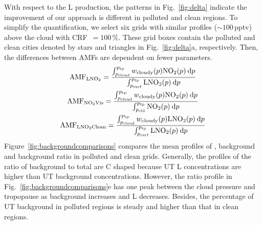 \documentclass[amt]{copernicus}
\begin{document}
With respect to the L production, the patterns in Fig.~\ref{fig:delta} indicate the improvement of our approach is different in polluted and clean regions.
To simplify the quantification, we select six grids with similar  profiles ($\sim 100$\,pptv) above the cloud with CRF~$= 100$\,{\%}.
These grid boxes contain the polluted and clean cities denoted by stars and triangles in Fig.~\ref{fig:delta}a, respectively.
Then, the differences between AMFs are dependent on fewer parameters.
\begin{gather} \label{AMFLNO2_crf100}
\mathrm{AMF}_{\chem{LNO_2}} = \frac{\int_{p_\mathrm{cloud}}^{p_\mathrm{tp}} w_\mathrm{cloudy}(p) \chem{NO_2}(p) \: \mathrm{d}p}{\int_{p_\mathrm{surf}}^{p_\mathrm{tp}} \chem{LNO_2}(p) \: \mathrm{d}p}
\\
 \label{AMFNO2Vis_crf100}
\mathrm{AMF}_{\chem{NO_2}\mathrm{Vis}} = \frac{\int_{p_\mathrm{cloud}}^{p_\mathrm{tp}} w_\mathrm{cloudy}(p) \chem{NO_2}(p) \: \mathrm{d}p}{\int_{p_\mathrm{cld}}^{p_\mathrm{tp}} \chem{NO_2}(p) \: \mathrm{d}p}
\\ \label{AMFLNO2Clean_crf100}
\mathrm{AMF}_{\chem{LNO_2}\mathrm{Clean}} = \frac{\int_{p_\mathrm{cloud}}^{p_\mathrm{tp}} w_\mathrm{cloudy}(p) \chem{LNO_2}(p) \: \mathrm{d}p}{\int_{p_\mathrm{surf}}^{p_\mathrm{tp}} \chem{LNO_2}(p) \: \mathrm{d}p}
\end{gather}
Figure~\ref{fig:backgroundcomparisons} compares the mean profiles of , background  and background  ratio in polluted and clean grids.
Generally, the profiles of the ratio of background  to total  are C shaped because UT L concentrations are higher than UT background  concentrations.
However, the ratio profile in Fig.~\ref{fig:backgroundcomparisons}e has one peak between the cloud pressure and tropopause as background  increases and L decreases.
Besides, the percentage of UT background  in polluted regions is steady and higher than that in clean regions.
\end{document}
